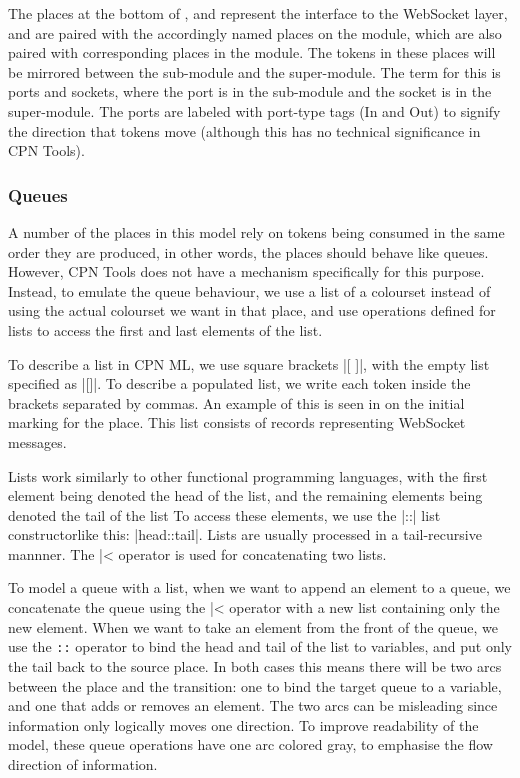 	The places at the bottom of ,  and  
	represent the interface to the WebSocket layer, and are paired with the
	accordingly named places on the  module, which are also
	paired with corresponding places in the  module. The tokens in
	these places will be mirrored between the sub-module and the super-module. The
	term for this is ports and sockets, where the port is in the sub-module and
	the socket is in the super-module. The ports are labeled with port-type tags
	(In and Out) to signify the direction that tokens move (although this has no
	technical significance in CPN Tools).
	
	
	\subsubsection{Queues}
	
		A number of the places in this model rely on tokens being consumed in the same
		order they are produced, in other words, the places should behave like queues.
		However, CPN Tools does not have a mechanism specifically for this purpose.
		Instead, to emulate the queue behaviour, we use a list of a colourset
		instead of using the actual colourset we want in that place, and use
		operations defined for lists to access the first and last elements of the
		list.
		
		To describe a list in CPN ML, we use square brackets |[ ]|, with the empty
		list specified as |[]|. To describe a populated list, we write each token
		inside the brackets separated by commas. An example of this is seen in
		 on the initial marking for the 
		place. This list consists of records representing WebSocket messages.
		
		Lists work similarly to other functional programming languages, with the
		first element being denoted the head of the list, and the remaining elements
		being denoted the tail of the list To access these elements, we use the |::|
		list constructorlike this:
		|head::tail|. Lists are usually processed in a tail-recursive
		mannner. The |^^| operator is used for concatenating two lists.
		
		To model a queue with a list, when we want to append an
		element to a queue, we concatenate the queue using the |^^| operator with a
		new list containing only the new element. When we want to take an element from the front
		of the queue, we use the \lstinline-::- operator to bind the head and tail of the list to variables,
		and put only the tail back to the source place. In both cases this means there
		will be two arcs between the place and the transition: one to bind the
		target queue to a variable, and one that adds or removes an element. The two
		arcs can be misleading since information only logically moves one direction.
		To improve readability of the model, these queue operations have one arc
		colored gray, to emphasise the flow direction of information.
		
